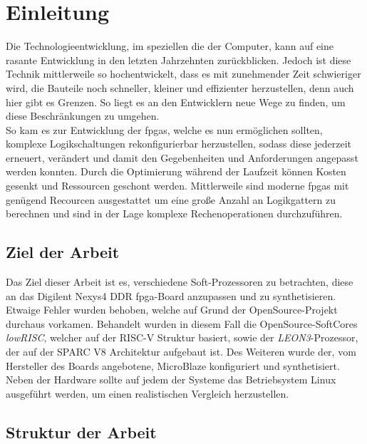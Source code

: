 \chapter{Einleitung}\label{ch:einleitung}

Die Technologieentwicklung, im speziellen die der Computer, kann auf eine rasante Entwicklung in den letzten
Jahrzehnten zurückblicken. Jedoch ist diese Technik mittlerweile so hochentwickelt, dass es mit zunehmender Zeit
schwieriger wird, die Bauteile noch schneller, kleiner und effizienter herzustellen, denn auch hier gibt es Grenzen.
So liegt es an den Entwicklern neue Wege zu finden, um diese Beschränkungen zu umgehen. \\
So kam es zur Entwicklung der \acp{fpga}, welche es nun ermöglichen sollten, komplexe Logikschaltungen
rekonfigurierbar herzustellen, sodass diese jederzeit erneuert, verändert und damit den Gegebenheiten und
Anforderungen angepasst werden konnten. Durch die Optimierung während der Laufzeit können Kosten gesenkt und
Ressourcen geschont werden. Mittlerweile sind moderne \acp{fpga} mit genügend Recourcen ausgestattet um eine
große Anzahl an Logikgattern zu berechnen und sind in der Lage komplexe Rechenoperationen durchzuführen.\\

\section{Ziel der Arbeit}\label{kap:zielderarbeit}

Das Ziel dieser Arbeit ist es, verschiedene Soft-Prozessoren zu betrachten, diese an das Digilent Nexys4 DDR \ac{fpga}-Board anzupassen und zu synthetisieren. Etwaige Fehler wurden behoben,
welche auf Grund der OpenSource-Projekt durchaus vorkamen. Behandelt wurden in diesem Fall die OpenSource-SoftCores \emph{lowRISC}, welcher auf der RISC-V Struktur basiert,
 sowie der \emph{LEON3}-Prozessor,
der auf der SPARC V8 Architektur aufgebaut ist. Des Weiteren wurde der, vom Hersteller des Boards angebotene, MicroBlaze konfiguriert und synthetisiert.\\
Neben der Hardware sollte auf jedem der Systeme das Betriebsystem Linux ausgeführt werden, um einen realistischen Vergleich herzustellen.


 \section{Struktur der Arbeit}\label{kap:strukturderarbeit}

